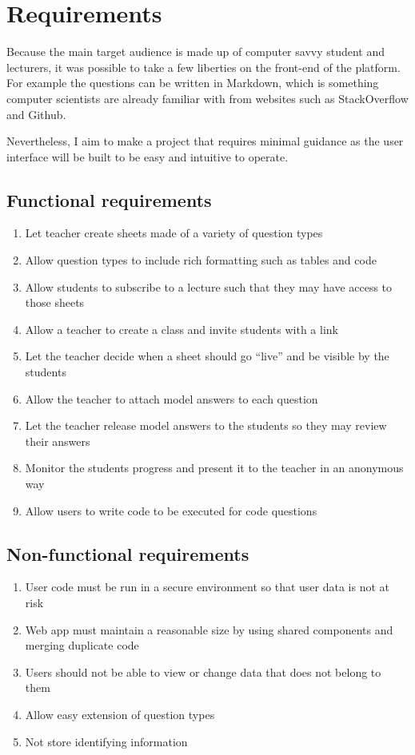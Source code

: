 
\chapter{Requirements}
Because the main target audience is made up of computer savvy student and lecturers, it was possible to take a few liberties on the front-end of the platform. For example the questions can be written in Markdown, which is something computer scientists are already familiar with from websites such as StackOverflow and Github.

Nevertheless, I aim to make a project that requires minimal guidance as the user interface will be built to be easy and intuitive to operate.

\section{Functional requirements}
\begin{enumerate}
\item   Let teacher create sheets made of a variety of question types
\item 	Allow question types to include rich formatting such as tables and code
\item 	Allow students to subscribe to a lecture such that they may have access to those sheets
\item 	Allow a teacher to create a class and invite students with a link
\item 	Let the teacher decide when a sheet should go “live” and be visible by the students
\item 	Allow the teacher to attach model answers to each question
\item   Let the teacher release model answers to the students so they may review their answers
\item 	Monitor the students progress and present it to the teacher in an anonymous way
\item   Allow users to write code to be executed for code questions
\end{enumerate}


\section{Non-functional requirements}
\begin{enumerate}
	\item User code must be run in a secure environment so that user data is not at risk
	\item Web app must maintain a reasonable size by using shared components and merging duplicate code
	\item Users should not be able to view or change data that does not belong to them
	\item Allow easy extension of question types
	\item Not store identifying information
\end{enumerate}